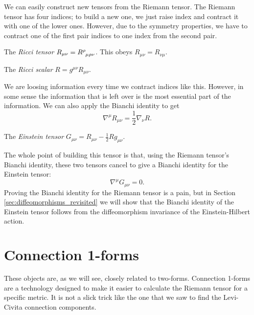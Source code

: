 We can easily construct new tensors from the Riemann tensor. The Riemann tensor has four indices; to build a new one, we just raise index and contract it with one of the lower ones.
However, due to the symmetry properties, we have to contract one of the first pair indices to one index from the second pair.
\begin{definition}[]
  The \emph{Ricci tensor} $R_{\mu\nu} = R \indices{^{\rho}_{\mu\rho\nu}}$. This obeys $R_{\mu\nu} = R_{\nu\mu}$.
\end{definition}
\begin{definition}[]
  The \emph{Ricci scalar} $R= g^{\mu\nu} R_{\mu\nu}$.
\end{definition}
We are loosing information every time we contract indices like this. However, in some sense the information that is left over is the most essential part of the information. 
We can also apply the Bianchi identity to get
\begin{equation}
  \nabla^{\mu} R_{\mu\nu} = \frac{1}{2} \nabla_{\nu} R.
\end{equation}

\begin{definition}[]
  The \emph{Einstein tensor} $G_{\mu\nu} = R_{\mu\nu} - \frac{1}{2} Rg_{\mu\nu}$.
\end{definition}
The whole point of building this tensor is that, using the Riemann tensor's Bianchi identity, these two tensors cancel to give a Bianchi identity for the Einstein tensor: 
\begin{equation}
  \nabla^{\mu} G_{\mu\nu} = 0.
\end{equation}
Proving the Bianchi identity for the Riemann tensor is a pain, but in Section \ref{sec:diffeomorphisms_revisited} we will show that the Bianchi identity of the Einstein tensor follows from the diffeomorphism invariance of the Einstein-Hilbert action.

\section{Connection 1-forms}%
\label{sec:connection_1_forms}

These objects are, as we will see, closely related to two-forms.
Connection 1-forms are a technology designed to make it easier to calculate the Riemann tensor for a specific metric. 
It is not a slick trick like the one that we saw to find the Levi-Civita connection components.

